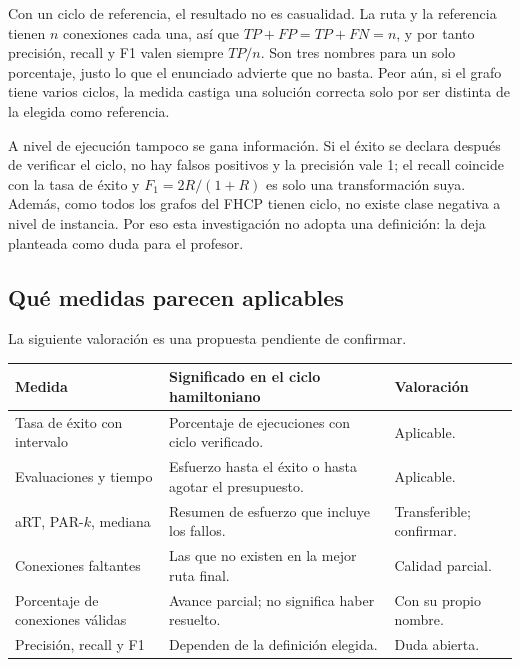 Con un ciclo de referencia, el resultado no es casualidad. La ruta y la referencia tienen $n$ conexiones cada una, así que $TP+FP=TP+FN=n$, y por tanto precisión, recall y F1 valen siempre $TP/n$. Son tres nombres para un solo porcentaje, justo lo que el enunciado advierte que no basta. Peor aún, si el grafo tiene varios ciclos, la medida castiga una solución correcta solo por ser distinta de la elegida como referencia.

A nivel de ejecución tampoco se gana información. Si el éxito se declara después de verificar el ciclo, no hay falsos positivos y la precisión vale 1; el recall coincide con la tasa de éxito y $F_1=2R/(1+R)$ es solo una transformación suya. Además, como todos los grafos del FHCP tienen ciclo,\cite{de3} no existe clase negativa a nivel de instancia. Por eso esta investigación no adopta una definición: la deja planteada como duda para el profesor.

\subsection{Qué medidas parecen aplicables}
La siguiente valoración es una propuesta pendiente de confirmar.

\begin{center}

\begin{adjustbox}{max width=\linewidth}
\begin{tabular}{@{}P{4.6cm}P{7.6cm}P{3.4cm}@{}}
\toprule
Medida & Significado en el ciclo hamiltoniano & Valoración\\
\midrule
Tasa de éxito con intervalo & Porcentaje de ejecuciones con ciclo verificado. & Aplicable.\\
Evaluaciones y tiempo & Esfuerzo hasta el éxito o hasta agotar el presupuesto. & Aplicable.\\
aRT, PAR-$k$, mediana & Resumen de esfuerzo que incluye los fallos. & Transferible; confirmar.\\
Conexiones faltantes & Las que no existen en la mejor ruta final. & Calidad parcial.\\
Porcentaje de conexiones válidas & Avance parcial; no significa haber resuelto. & Con su propio nombre.\\
Precisión, recall y F1 & Dependen de la definición elegida. & Duda abierta.\\
\bottomrule
\end{tabular}
\end{adjustbox}
\end{center}

